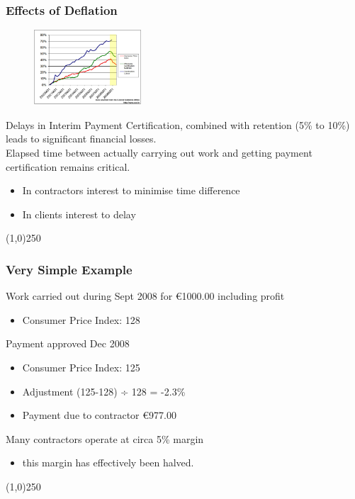\begin{frame}
\frametitle{Effects of Deflation}
\begin{figure}
	\centering
		\includegraphics[width = 4cm]{images/deflation2.jpg}
	\label{fig:deflation2b}
\end{figure}
Delays in Interim Payment Certification, combined with retention (5\% to 10\%) leads to significant financial losses.\\
Elapsed time between actually carrying out work and getting payment certification remains critical.\\
\begin{itemize}
	\item In contractors interest to minimise time difference
	\item In clients interest to delay
\end{itemize}
\end{frame}
\begin{center}\line(1,0){250}\end{center}






\begin{frame}
\frametitle{Very Simple Example}
Work carried out during Sept 2008 for  \euro1000.00 including profit
\begin{itemize}
	\item Consumer Price Index: 128
\end{itemize}
Payment approved Dec 2008
\begin{itemize}
	\item Consumer Price Index: 125
	\item Adjustment (125-128) ÷ 128 = -2.3\%
	\item Payment due to contractor \euro977.00
\end{itemize}
Many contractors operate at circa 5\% margin
\begin{itemize}
	\item this margin has effectively been halved.
\end{itemize}
\end{frame}
\begin{center}\line(1,0){250}\end{center}






